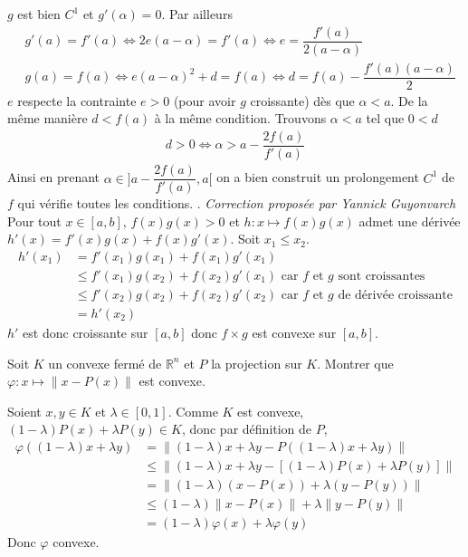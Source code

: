 \documentclass{fancybook}
\begin{document}
\newline
$g$ est bien $C^1$ et $g'(\alpha)=0$. Par ailleurs
\begin{align*}
    &g'(a)=f'(a)\iff2e(a-\alpha)=f'(a)\iff e=\dfrac{f'(a)}{2(a-\alpha)} \\
    &g(a)=f(a)\iff e(a-\alpha)^2+d=f(a)\iff d=f(a)-\dfrac{f'(a)(a-\alpha)}{2}
\end{align*}
\newline \newline
$e$ respecte la contrainte $e>0$ (pour avoir $g$ croissante) dès que $\alpha<a$. De la même manière $d<f(a)$ à la même condition.
\newline \newline
Trouvons $\alpha<a$ tel que $0<d$
\begin{align*}
    d>0\iff\alpha>a-\dfrac{2f(a)}{f'(a)}
\end{align*}
\newline
Ainsi en prenant $\alpha\in]a-\dfrac{2f(a)}{f'(a)},a[$ on a bien construit un prolongement $C^1$ de $f$ qui vérifie toutes les conditions.\newline
{}. \hfill \textit{Correction proposée par Yannick Guyonvarch}\newline
Pour tout $x\in[a,b]$, $f(x)g(x)>0$ et $h:x\mapsto f(x)g(x)$ admet une dérivée $h'(x)=f'(x)g(x)+f(x)g'(x)$.
\newline
Soit $x_1\leq x_2$.
\begin{align*}
    h'(x_1)&=f'(x_1)g(x_1)+f(x_1)g'(x_1) \\
    &\leq f'(x_1)g(x_2)+f(x_2)g'(x_1)\text{ car $f$ et $g$ sont croissantes} \\
    &\leq f'(x_2)g(x_2)+f(x_2)g'(x_2)\text{ car $f$ et $g$ de dérivée croissante}\\
    &= h'(x_2)
\end{align*}
\newline
$h'$ est donc croissante sur $[a,b]$ donc $f\times g$ est convexe sur $[a,b]$.


\begin{exercice}
Soit $K$ un convexe fermé de $\mathbb R^n$ et $P$ la projection sur $K$.\newline
Montrer que $\varphi:x\mapsto \|x-P(x)\|$ est convexe.
\end{exercice}
Soient $x,y\in K$ et $\lambda \in [0,1]$.\newline
Comme $K$ est convexe, $(1-\lambda)P(x) + \lambda P(y)\in K$, donc par définition de $P$,
$$\begin{aligned}\varphi((1-\lambda)x  + \lambda y) &= \|(1-\lambda)x  + \lambda y - P((1-\lambda)x  + \lambda y)\| \\
&\leq \|(1-\lambda)x  + \lambda y - [(1-\lambda)P(x) + \lambda P(y)] \| \\
&= \| (1-\lambda)(x-P(x)) + \lambda (y-P(y))\| \\
&\leq (1-\lambda) \|x-P(x)\| + \lambda \|y-P(y)\| \\
&= (1-\lambda) \varphi(x) + \lambda \varphi(y)
\end{aligned}$$
Donc $\varphi$ convexe.
\end{document}
